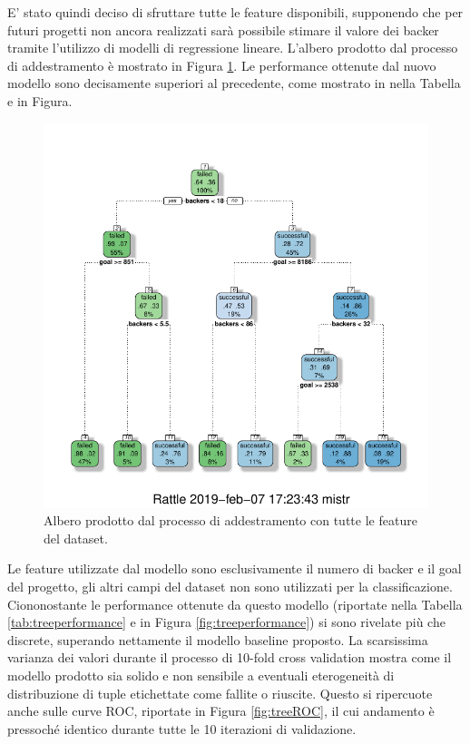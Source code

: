 \newpage
E' stato quindi deciso di sfruttare tutte le feature disponibili, supponendo che per futuri progetti non ancora realizzati sarà possibile stimare il valore dei backer tramite l'utilizzo di modelli di regressione lineare. L'albero prodotto dal processo di addestramento è mostrato in Figura \ref{fig:tree}. Le performance ottenute dal nuovo modello sono decisamente superiori al precedente, come mostrato in nella Tabella e in Figura.\\
\begin{figure}
	\centering
	\includegraphics[width=0.9\linewidth]{../FinalResults/tree}
	\caption{Albero prodotto dal processo di addestramento con tutte le feature del dataset.}
	\label{fig:tree}
\end{figure}
Le feature utilizzate dal modello sono esclusivamente il numero di backer e il goal del progetto, gli altri campi del dataset non sono utilizzati per la classificazione. Ciononostante le performance ottenute da questo modello (riportate nella Tabella \ref{tab:treeperformance} e in Figura \ref{fig:treeperformance}) si sono rivelate più che discrete, superando nettamente il modello baseline proposto. La scarsissima varianza dei valori durante il processo di 10-fold cross validation mostra come il modello prodotto sia solido e non sensibile a eventuali eterogeneità di distribuzione di tuple etichettate come fallite o riuscite. Questo si ripercuote anche sulle curve ROC, riportate in Figura \ref{fig:treeROC}, il cui andamento è pressoché identico durante tutte le 10 iterazioni di validazione.

